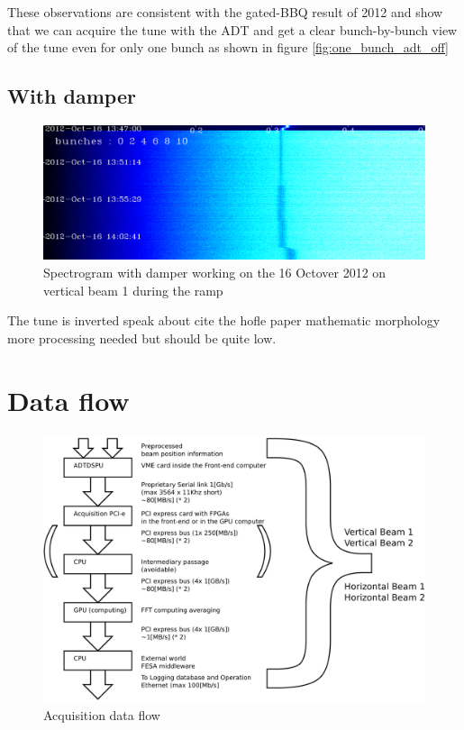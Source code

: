 	These observations are consistent with the gated-\gls{BBQ} result of 2012 \cite{Valuch12} and show that we can acquire the tune with the \gls{ADT} and get a clear bunch-by-bunch view of the tune even for only one bunch as shown in figure \ref{fig:one_bunch_adt_off}

	\subsection{With damper}

	\begin{figure}[H]
	\caption{Spectrogram with damper working on the 16 Octover 2012 on vertical beam 1 during the ramp}
	\centering
	\label{fig:ramp}
	\includegraphics[scale=0.3]{md-121016-vb1-m1-6bunches-10acc-1347-1405-ramp.pdf}
	\end{figure}

	The tune is inverted speak about cite the hofle paper mathematic morphology more processing needed but should be quite low.

\section{Data flow}

\begin{figure}[H]
\caption{Acquisition data flow}
\centering
\includegraphics[scale=0.3]{dataflow.pdf}
\end{figure}

